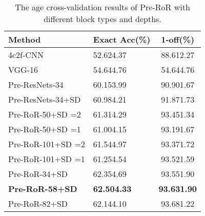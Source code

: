 \documentclass[journal]{IEEEtran}
\begin{document}
\begin{table}[h]
\caption{The age cross-validation results of Pre-RoR with different block types and depths.}
\centering
\begin{tabular}{|p{3.2cm}|p{2.1cm}|c|}
\hline
Method &Exact Acc(\%)  &1-off(\%)  \\ 
\hline\hline
4c2f-CNN  &52.624.37   &88.612.27\\
\hline
VGG-16    &54.644.76 &54.644.76\\
\hline
Pre-ResNets-34  &60.153.99 &90.901.67\\
\hline
Pre-ResNets-34+SD &60.984.21 &91.871.73\\
\hline
Pre-RoR-50+SD =2 &61.314.29 &93.451.34\\
\hline
Pre-RoR-50+SD =1 &61.004.15 &93.191.67\\
\hline
Pre-RoR-101+SD =2  &61.544.97 &93.371.72\\
\hline
Pre-RoR-101+SD =1  &61.254.54 &93.521.59\\
\hline
Pre-RoR-34+SD           &62.354.69 &93.551.90\\
\hline
\textbf{Pre-RoR-58+SD}           &\textbf{62.504.33} &\textbf{93.631.90}\\
\hline
Pre-RoR-82+SD           &62.144.10 &93.681.22\\
\hline
\end{tabular}

\label{tab:tab10}
\end{table}
\end{document}
